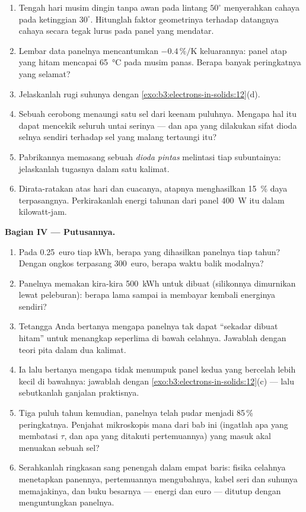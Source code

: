 \begin{problem}
\begin{enumerate}[resume]
  \item Tengah hari musim dingin tanpa awan pada lintang $50^\circ$
        menyerahkan cahaya pada ketinggian $30^\circ$. Hitunglah faktor
        geometrinya terhadap datangnya cahaya secara tegak lurus pada panel
        yang mendatar.
  \item Lembar data panelnya mencantumkan $-0.4\,\%/\text{K}$ keluarannya:
        panel atap yang hitam mencapai \qty{65}{\celsius} pada musim panas.
        Berapa banyak peringkatnya yang selamat?
  \item Jelaskanlah rugi suhunya dengan
        \cref{exo:b3:electrons-in-solids:12}(d).
  \item Sebuah cerobong menaungi satu sel dari keenam puluhnya. Mengapa hal itu
        dapat mencekik seluruh untai serinya --- dan apa yang dilakukan
        sifat dioda selnya sendiri terhadap sel yang malang tertaungi itu?
  \item Pabrikannya memasang sebuah \emph{dioda pintas} melintasi tiap
        subuntainya: jelaskanlah tugasnya dalam satu kalimat.
  \item Dirata-ratakan atas hari dan cuacanya, atapnya menghasilkan
        \qty{15}{\percent} daya terpasangnya. Perkirakanlah energi tahunan
        dari panel \qty{400}{W} itu dalam kilowatt-jam.
\end{enumerate}

\medskip\noindent\textbf{Bagian IV --- Putusannya.}

\begin{enumerate}[resume]
  \item Pada \qty{0.25}{euro} tiap kWh, berapa yang dihasilkan panelnya
        tiap tahun? Dengan ongkos terpasang \qty{300}{euro},
        berapa waktu balik modalnya?
  \item Panelnya memakan kira-kira \qty{500}{kWh} untuk dibuat
        (silikonnya dimurnikan lewat peleburan): berapa lama sampai ia
        membayar kembali energinya sendiri?
  \item Tetangga Anda bertanya mengapa panelnya tak dapat
        ``sekadar dibuat hitam'' untuk menangkap seperlima di bawah celahnya. Jawablah
        dengan teori pita dalam dua kalimat.
  \item Ia lalu bertanya mengapa tidak menumpuk panel kedua yang bercelah lebih kecil
        di bawahnya: jawablah dengan
        \cref{exo:b3:electrons-in-solids:12}(c) --- lalu sebutkanlah
        ganjalan praktisnya.
  \item Tiga puluh tahun kemudian, panelnya telah pudar menjadi 85\,\%
        peringkatnya. Penjahat mikroskopis mana dari bab ini
        (ingatlah apa yang membatasi $\tau$, dan apa yang ditakuti pertemuannya)
        yang masuk akal menuakan sebuah sel?
  \item Serahkanlah ringkasan sang penengah dalam empat baris: fisika celahnya
        menetapkan panennya, pertemuannya mengubahnya, kabel seri
        dan suhunya memajakinya, dan buku besarnya --- energi
        dan euro --- ditutup dengan menguntungkan panelnya.
\end{enumerate}
\end{problem}
